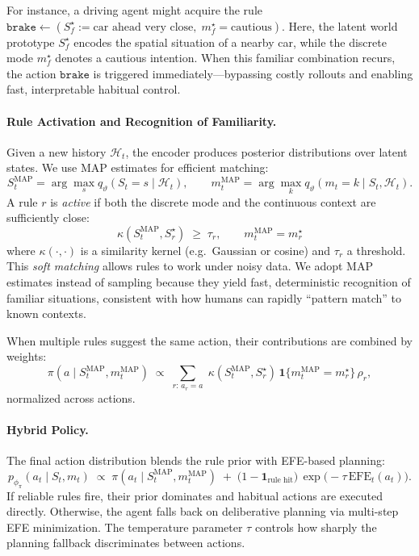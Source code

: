 \documentclass{article} %
\begin{document}
For instance, a driving agent might acquire the rule
$
\texttt{brake} \gets (S_f^\star:= \text{car ahead very close}, \; m_f^\star = \text{cautious}).
$
Here, the latent world prototype $S_f^\star$ encodes the spatial situation of a nearby car, while the 
discrete mode $m_f^\star$ denotes a cautious intention. When this familiar combination recurs, the 
action $\texttt{brake}$ is triggered immediately—bypassing costly rollouts and enabling fast, interpretable 
habitual control.
\paragraph{Rule Activation and Recognition of Familiarity.}
Given a new history \(\mathcal H_t\), the encoder produces posterior distributions over latent states.  
We use MAP estimates for efficient matching:
{\small \[
S_t^{\text{MAP}}=\arg\max_s q_\vartheta(S_t=s\mid \mathcal H_t),\qquad
m_t^{\text{MAP}}=\arg\max_k q_\vartheta(m_t=k\mid S_t,\mathcal H_t).
\]}
A rule \(r\) is \emph{active} if both the discrete mode and the continuous context are sufficiently close:
\[
\kappa(S_t^{\text{MAP}}, S_r^\star)\; \ge \;\tau_r,\qquad
m_t^{\text{MAP}} = m_r^\star
\]
where \(\kappa(\cdot,\cdot)\) is a similarity kernel (e.g.\ Gaussian or cosine) and \(\tau_r\) a threshold. This \emph{soft matching} allows rules to work under noisy data. We adopt MAP estimates instead of sampling because they yield fast, deterministic recognition of familiar situations, consistent with how humans can rapidly “pattern match” to known contexts.  

When multiple rules suggest the same action, their contributions are combined by weights:
{\small\[
\pi(a\mid S_t^{\mathrm{MAP}}, m_t^{\mathrm{MAP}})\;\propto\;
\sum_{r:\,a_r=a}\;\kappa(S_t^{\mathrm{MAP}},S_r^\star)\,\mathbf{1}\{m_t^{\mathrm{MAP}}=m_r^\star\}\,\rho_r,
\]}
normalized across actions.  
\paragraph{Hybrid Policy.}
The final action distribution blends the rule prior with EFE-based planning:
\begin{equation}
\label{eq:policy_blend}
p_{\phi_{\pi}}(a_t\mid S_t,m_t)\;\propto\;
\pi(a_t\mid S_t^{\text{MAP}},m_t^{\text{MAP}})
\;+\;\big(1-\mathbf{1}_{\text{rule hit}}\big)\,\exp\!\big(-\tau\,\text{EFE}_t(a_t)\big).
\end{equation}
If reliable rules fire, their prior dominates and habitual actions are executed directly.  
Otherwise, the agent falls back on deliberative planning via multi-step EFE minimization.  
The temperature parameter \(\tau\) controls how sharply the planning fallback discriminates between actions.  
\end{document}
